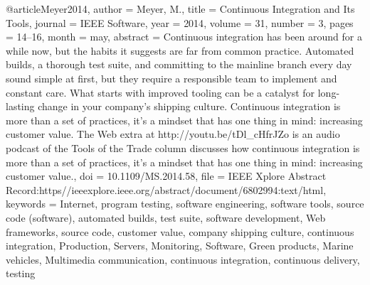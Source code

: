 {@article{Meyer2014,
  author   = {Meyer, M.},
  title    = {Continuous {Integration} and {Its} {Tools}},
  journal  = {IEEE Software},
  year     = {2014},
  volume   = {31},
  number   = {3},
  pages    = {14--16},
  month    = may,
  abstract = {Continuous integration has been around for a while now, but the habits it suggests are far from common practice. Automated builds, a thorough test suite, and committing to the mainline branch every day sound simple at first, but they require a responsible team to implement and constant care. What starts with improved tooling can be a catalyst for long-lasting change in your company's shipping culture. Continuous integration is more than a set of practices, it's a mindset that has one thing in mind: increasing customer value. The Web extra at http://youtu.be/tDl\_cHfrJZo is an audio podcast of the Tools of the Trade column discusses how continuous integration is more than a set of practices, it's a mindset that has one thing in mind: increasing customer value.},
  doi      = {10.1109/MS.2014.58},
  file     = {IEEE Xplore Abstract Record:https\://ieeexplore.ieee.org/abstract/document/6802994:text/html},
  keywords = {Internet, program testing, software engineering, software tools, source code (software), automated builds, test suite, software development, Web frameworks, source code, customer value, company shipping culture, continuous integration, Production, Servers, Monitoring, Software, Green products, Marine vehicles, Multimedia communication, continuous integration, continuous delivery, testing}
}

}
